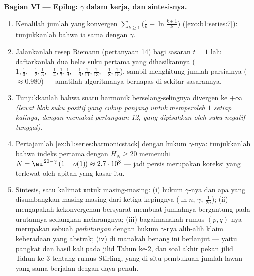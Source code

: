 \begin{problem}[{Soal akhir pekan --- $H_n = \ln n + \gamma +
\frac{1}{2n} + O(n^{-2})$, dan menyusun ulang $1 - \frac12 +
\frac13 - \dots$ menjadi $\frac{\ln 2}{2}$}]
\medskip
\noindent\textbf{Bagian VI --- Epilog: $\gamma$ dalam kerja, dan
sintesisnya.}
\begin{enumerate}[resume]
  \item Kenalilah jumlah  yang konvergen
        $\sum_{k\geq1} \bigl(\frac1k - \ln\frac{k+1}{k}\bigr)$
        (\cref{exo:b1:series:7}): tunjukkanlah bahwa ia sama dengan $\gamma$.
  \item Jalankanlah resep Riemann (pertanyaan 14) bagi sasaran $t =
        1$ lalu daftarkanlah dua belas suku pertama yang dihasilkannya ($1, \frac13,
        -\frac12, \frac15, -\frac14, \frac17, \frac19, -\frac16,
        \frac1{11}, \frac1{13}, -\frac18, \frac1{15}$),
        sambil menghitung jumlah parsialnya ($\approx 0.980$) --- amatilah
        algoritmanya bernapas di sekitar sasarannya.
  \item Tunjukkanlah bahwa suatu  harmonik
        berselang-selingnya divergen ke $+\infty$ \emph{(lewat blok suku
        positif yang cukup panjang untuk memperoleh $1$ setiap kalinya, dengan memakai pertanyaan
        12, yang dipisahkan oleh suku negatif tunggal)}.
  \item Pertajamlah \cref{ex:b1:series:harmonicstack} dengan
        hukum $\gamma$-nya: tunjukkanlah bahwa indeks pertama dengan $H_N \geq
        20$ memenuhi $N = \eu^{\,20 - \gamma}\,(1 + o(1))
        \approx 2.7\cdot10^{8}$ --- jadi  persis
        merupakan koreksi yang terlewat oleh apitan yang kasar itu.
  \item Sintesis, satu kalimat untuk masing-masing: (i) hukum $\gamma$-nya dan
        apa yang disumbangkan masing-masing dari ketiga kepingnya ($\ln n$, $\gamma$,
        $\frac{1}{2n}$); (ii) mengapakah kekonvergenan bersyarat
        membuat jumlahnya bergantung pada urutannya sedangkan  melarangnya; (iii) bagaimanakah rumus $(p,q)$-nya
        merupakan sebuah \emph{perhitungan} dengan hukum $\gamma$-nya alih-alih
        klaim keberadaan yang abstrak; (iv) di manakah benang ini
        berlanjut --- yaitu  pangkat dan hasil kali 
        pada jilid Tahun ke-2, dan soal akhir pekan jilid Tahun ke-3
        tentang rumus Stirling, yang di situ pembukuan
        jumlah lawan  yang sama berjalan dengan daya penuh.

\end{enumerate}
\end{problem}
